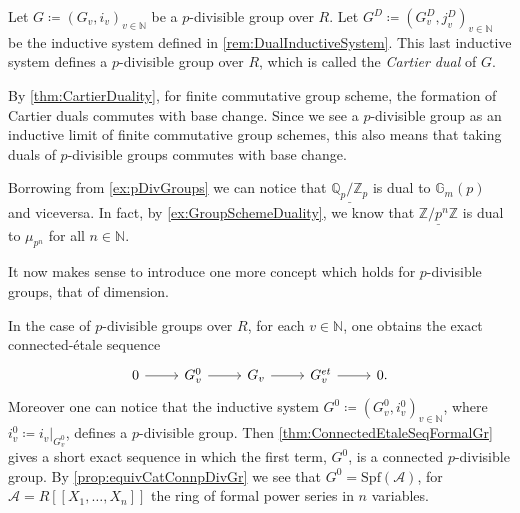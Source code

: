 \begin{defn}
	Let $G \coloneqq \left( G_v, i_v \right)_{v \in \mathbb{N}}$ be a $p$-divisible group over $R$.
	Let $G^D \coloneqq \left( G_v^D, j_v^D \right)_{v \in \mathbb{N}}$ be the inductive system
	defined in \cref{rem:DualInductiveSystem}.
	This last inductive system defines a $p$-divisible group over $R$,
	which is called the {\em Cartier dual} of $G$.
\end{defn}


\begin{rem}[]\label{rem:pDivDualityBaseChange}
	By \cref{thm:CartierDuality}, for finite commutative group scheme, the formation
	of Cartier duals commutes with base change.
	Since we see a $p$-divisible group as an inductive limit of finite commutative
	group schemes, this also means that taking duals of $p$-divisible groups
	commutes with base change.
\end{rem}


\begin{ex}[]
	Borrowing from \cref{ex:pDivGroups} we can notice that
	$\underline{\mathbb{Q}_p/\mathbb{Z}_{p}}$ is dual to $\mathbb{G}_m(p)$
	and viceversa.
	In fact, by \cref{ex:GroupSchemeDuality}, we know that
	$\underline{\mathbb{Z}/p^n\mathbb{Z}}$ is dual to $\mu_{p^n}$ for all $n \in \mathbb{N}$.
\end{ex}


\noindent
It now makes sense to introduce one more concept which holds for $p$-divisible
groups, that of dimension.
\begin{rem}[]\label{rem:ConnectedComponentpDivGroup}
	In the case of $p$-divisible groups over $R$, for each $v \in \mathbb{N}$, one obtains
	the exact connected-étale sequence
	\begin{equation*}
	\begin{tikzcd}
		0 \arrow[r, "", rightarrow] &
		G^0_v \arrow[r, "", rightarrow] &
		G_v \arrow[r, "", rightarrow] &
		G^{et}_v \arrow[r, "", rightarrow] &
		0
	.\end{tikzcd}
	\end{equation*}
	Moreover one can notice that the inductive system 
	$G^0 \coloneqq \left( G^0_v, i^0_v \right)_{v \in \mathbb{N}}$,
	where $i^0_v \coloneqq \left.i_v\right|_{G^0_v}$, defines a $p$-divisible group.
	Then \cref{thm:ConnectedEtaleSeqFormalGr} gives a short exact sequence
	in which the first term, $G^0$, is a connected $p$-divisible group.
	By \cref{prop:equivCatConnpDivGr} we see that $G^0 = \mathrm{Spf}(\mathscr{A})$,
	for $\mathscr{A} = R [\![ X_1, \ldots, X_{ n } ]\!]$ the ring of 
	formal power series in $n$ variables.
\end{rem}


